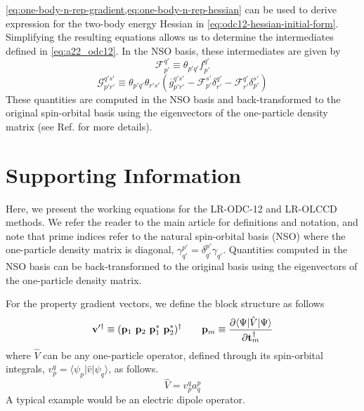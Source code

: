 \begin{subappendices}
\cref{eq:one-body-n-rep-gradient,eq:one-body-n-rep-hessian} can be used to derive expression for the two-body energy Hessian in \cref{eq:odc12-hessian-initial-form}. Simplifying the resulting equations allows us to determine the intermediates defined in \cref{eq:a22_odc12}. In the NSO basis, these intermediates are given by
\begin{equation}
    \label{eq:fancy-f-intermediate}
    \mathcal{F}_{p'}^{q'}
    \equiv
    \theta_{p'q'}
    f_{p'}^{q'}
\end{equation}
\begin{equation}
    \label{eq:fancy-g-intermediate}
    \mathcal{G}_{p'r'}^{q's'}
    \equiv
    \theta_{p'q'}
    \theta_{r's'}
    (
        \overline{g}_{p'r'}^{q's'}
        -
        \mathcal{F}_{p'}^{s'}
        \delta_{r'}^{q'}
        -
        \mathcal{F}_{r'}^{q'}
        \delta_{p'}^{s'}
    )
\end{equation}
These quantities are computed in the NSO basis and back-transformed to the
original spin-orbital basis using the eigenvectors of the one-particle density
matrix (see Ref.\@ {} for more details).


\section{Supporting Information}
\label{sec:suppinfo}

Here, we present the working equations for the LR-ODC-12 and LR-OLCCD methods.
We refer the reader to the main article for definitions and notation, and note that
prime indices refer to the natural spin-orbital basis (NSO) where the one-particle
density matrix is diagonal, \(\gamma^{p'}_{q'}=\delta^{p'}_{q'}\gamma_{q'}\).
Quantities computed in the NSO basis can be back-transformed to the original basis using the eigenvectors of the one-particle density matrix.

For the property gradient vectors, we define the block structure as follows
\begin{equation}
    \mathbf{v}'^\dagger
    \equiv
    (\mathbf{p}_1\ \mathbf{p}_2\ \mathbf{p}_1^*\ \mathbf{p}_2^*)^\dagger
    \qquad
    \mathbf{p}_m
    \equiv
    \frac{%
        \partial \langle\Psi|\hat{V}|\Psi\rangle
    }{%
        \partial \mathbf{t}_m^\dagger
    }
\end{equation}
where \(\hat{V}\) can be any one-particle operator, defined through its
spin-orbital integrals, \(v_p^q=\langle\psi_p|\hat{v}|\psi_q\rangle\), as
follows.
\begin{equation}
    \hat{V}
    =
    v_p^q
    a^p_q
\end{equation}
A typical example would be an electric dipole operator.



\end{subappendices}
